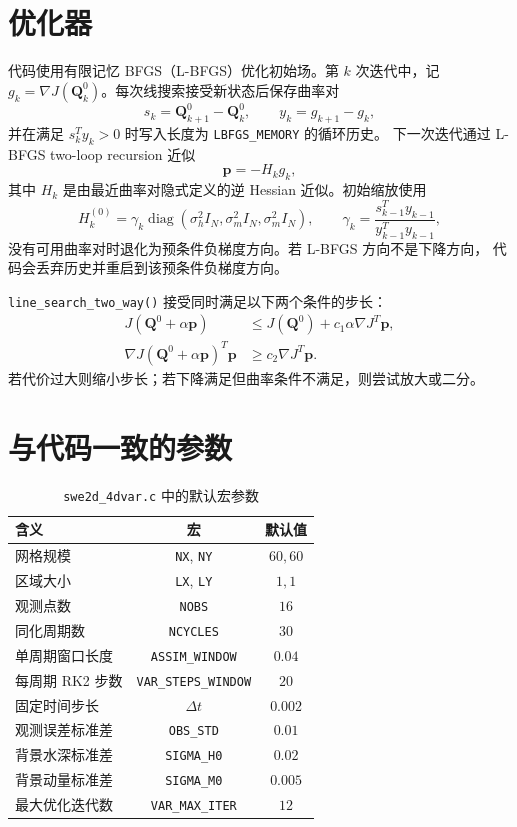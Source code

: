 \documentclass[12pt,a4paper]{article}
\begin{document}
\section{优化器}

代码使用有限记忆 BFGS（L-BFGS）优化初始场。第 $k$ 次迭代中，记
$g_k=\nabla J(\mathbf{Q}_k^0)$。每次线搜索接受新状态后保存曲率对
\[
s_k=\mathbf{Q}_{k+1}^0-\mathbf{Q}_k^0,\qquad
y_k=g_{k+1}-g_k,
\]
并在满足 $s_k^T y_k>0$ 时写入长度为 \texttt{LBFGS\_MEMORY} 的循环历史。
下一次迭代通过 L-BFGS two-loop recursion 近似
\begin{equation}
\mathbf{p}
=
 -H_k g_k,
\label{eq:direction}
\end{equation}
其中 $H_k$ 是由最近曲率对隐式定义的逆 Hessian 近似。初始缩放使用
\[
H_k^{(0)}
=
\gamma_k
\operatorname{diag}(\sigma_h^2 I_N,\sigma_m^2 I_N,\sigma_m^2 I_N),
\qquad
\gamma_k=\frac{s_{k-1}^T y_{k-1}}{y_{k-1}^T y_{k-1}},
\]
没有可用曲率对时退化为预条件负梯度方向。若 L-BFGS 方向不是下降方向，
代码会丢弃历史并重启到该预条件负梯度方向。

\texttt{line\_search\_two\_way()} 接受同时满足以下两个条件的步长：
\begin{align}
J(\mathbf{Q}^0+\alpha\mathbf{p})
&\le
J(\mathbf{Q}^0)+c_1\alpha\nabla J^T\mathbf{p},
\label{eq:armijo}\\
\nabla J(\mathbf{Q}^0+\alpha\mathbf{p})^T\mathbf{p}
&\ge
c_2\nabla J^T\mathbf{p}.
\label{eq:curvature}
\end{align}
若代价过大则缩小步长；若下降满足但曲率条件不满足，则尝试放大或二分。

\section{与代码一致的参数}

\begin{table}[htbp]
\centering
\caption{\texttt{swe2d\_4dvar.c} 中的默认宏参数}
\begin{tabular}{lcc}
\toprule
含义 & 宏 & 默认值\\
\midrule
网格规模 & \texttt{NX}, \texttt{NY} & $60,60$\\
区域大小 & \texttt{LX}, \texttt{LY} & $1,1$\\
观测点数 & \texttt{NOBS} & $16$\\
同化周期数 & \texttt{NCYCLES} & $30$\\
单周期窗口长度 & \texttt{ASSIM\_WINDOW} & $0.04$\\
每周期 RK2 步数 & \texttt{VAR\_STEPS\_WINDOW} & $20$\\
固定时间步长 & $\Delta t$ & $0.002$\\
观测误差标准差 & \texttt{OBS\_STD} & $0.01$\\
背景水深标准差 & \texttt{SIGMA\_H0} & $0.02$\\
背景动量标准差 & \texttt{SIGMA\_M0} & $0.005$\\
最大优化迭代数 & \texttt{VAR\_MAX\_ITER} & $12$\\
\bottomrule
\end{tabular}
\end{table}
\end{document}
